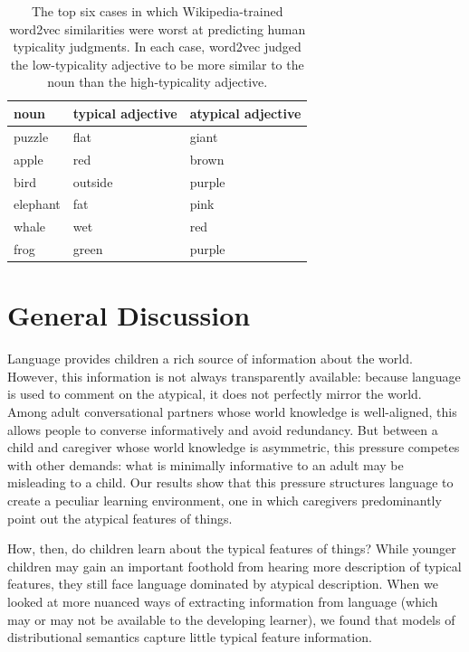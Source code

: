 \documentclass[10pt, letterpaper]{article}
\begin{document}
\begin{table}[tb]
\centering
\begin{tabular}{lll}
  \hline
noun & typical adjective & atypical adjective \\ 
  \hline
puzzle & flat & giant \\ 
  apple & red & brown \\ 
  bird & outside & purple \\ 
  elephant & fat & pink \\ 
  whale & wet & red \\ 
  frog & green & purple \\ 
   \hline
\end{tabular}
\caption{The top six cases in which Wikipedia-trained word2vec similarities were worst at predicting human typicality judgments. In each case, word2vec judged the low-typicality adjective to be more similar to the noun than the high-typicality adjective.} 
\label{tab:pairs_tab}
\end{table}

\hypertarget{general-discussion}{%
\section{General Discussion}\label{general-discussion}}

Language provides children a rich source of information about the world.
However, this information is not always transparently available: because
language is used to comment on the atypical, it does not perfectly
mirror the world. Among adult conversational partners whose world
knowledge is well-aligned, this allows people to converse informatively
and avoid redundancy. But between a child and caregiver whose world
knowledge is asymmetric, this pressure competes with other demands: what
is minimally informative to an adult may be misleading to a child. Our
results show that this pressure structures language to create a peculiar
learning environment, one in which caregivers predominantly point out
the atypical features of things.

How, then, do children learn about the typical features of things? While
younger children may gain an important foothold from hearing more
description of typical features, they still face language dominated by
atypical description. When we looked at more nuanced ways of extracting
information from language (which may or may not be available to the
developing learner), we found that models of distributional semantics
capture little typical feature information.
\end{document}
